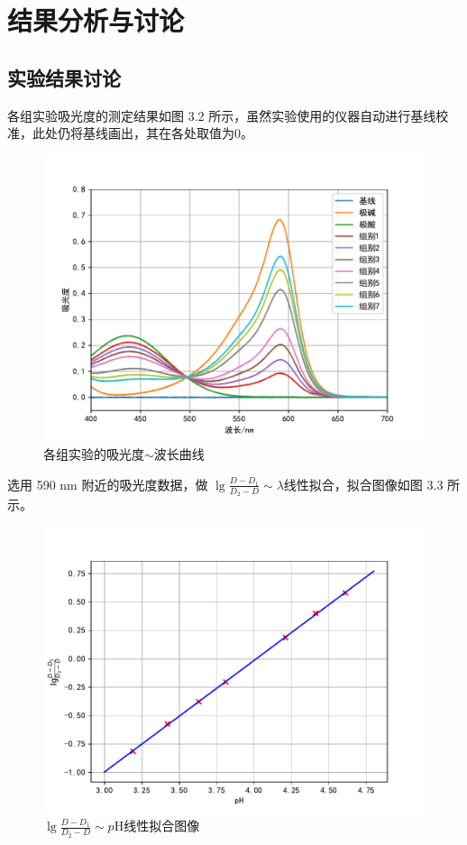 \documentclass[12pt]{ctexart}
\numberwithin{equation}{section}
\begin{document}
\section{结果分析与讨论}
\subsection{实验结果讨论}

各组实验吸光度的测定结果如图 3.2 所示，虽然实验使用的仪器自动进行基线校准，此处仍将基线画出，其在各处取值为0。

\begin{figure}[!h]
    \centering
    \includegraphics[scale=0.68]{plot_all.pdf}
    \caption{各组实验的吸光度$\sim$波长曲线}
\end{figure}

选用 590 nm 附近的吸光度数据，做
$\lg\frac{D-D_1}{D_2-D} \sim \lambda$线性拟合，拟合图像如图 3.3
所示。

\begin{figure}[!h]
    \centering
    \includegraphics[scale=0.68]{fitting.pdf}
    \caption{$\lg\frac{D-D_1}{D_2-D} \sim p\mathrm{H}$线性拟合图像}
\end{figure}
\end{document}
